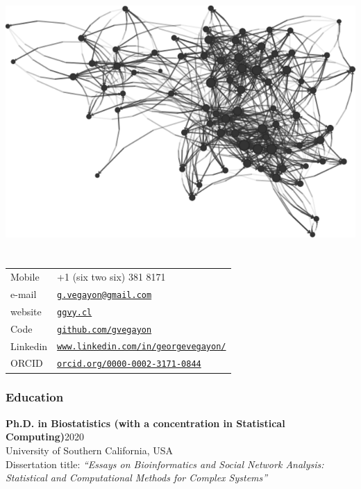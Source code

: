 \documentclass[letterpaper, 11pt]{article}
\def\name{George G. Vega Yon, Ph.D.}
\renewcommand{\bf}{\bfseries\color{teal}}
\begin{document}
\hfill \includegraphics[width=.4\linewidth]{fig/ukfaculty.pdf}\vspace{-6cm}
\part*{\color{darkgray}{\name}}


\begin{minipage}{0.50\linewidth}
  \begin{tabular}{>{}p{.2\linewidth}p{.79\linewidth}}
    Mobile & +1 (six two six) 381 8171 \\
    e-mail & \href{mailto:g.vegayon@gmail.com}{\tt g.vegayon@gmail.com} \\
    website & \href{https://ggvy.cl}{\tt ggvy.cl} \\
    Code & \href{https://github.com/gvegayon}{\tt github.com/gvegayon}\\
    Linkedin & \href{https://www.linkedin.com/in/georgevegayon/}{\tt www.linkedin.com/in/georgevegayon/} \\
    ORCID & \href{https://orcid.org/0000-0002-3171-0844}{\tt orcid.org/0000-0002-3171-0844}
  \end{tabular}
\end{minipage}


\section*{Education}


\noindent 
{\bf Ph.D. in Biostatistics (with a concentration in Statistical Computing)}\hfill 2020\\
University of Southern California, USA\\
Dissertation title: \emph{``Essays on Bioinformatics and Social Network Analysis: Statistical and Computational Methods for Complex Systems''}\vspace{.5cm}
\end{document}
